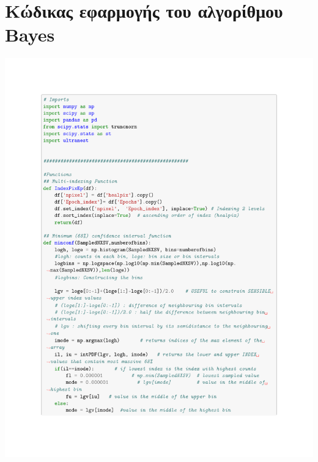 \chapter{Κώδικας εφαρμογής του αλγορίθμου \textlatin{Bayes}} 
\vfil\vfil\null

\begin{center}
    \includegraphics[width=1.0\linewidth,page=1]{Figures/Final Code Illustration-Bayesian.pdf}
\end{center}

